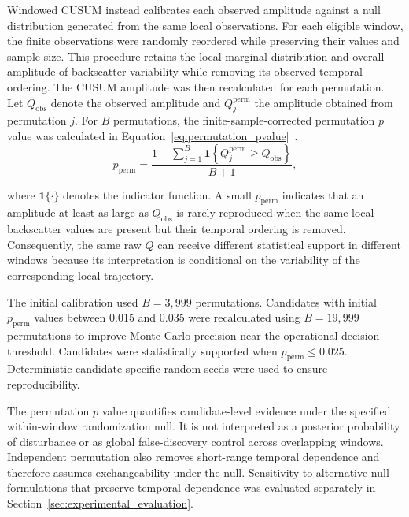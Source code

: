 Windowed CUSUM instead calibrates each observed amplitude against a null distribution generated from the same local observations. For each eligible window, the finite observations were randomly reordered while preserving their values and sample size. This procedure retains the local marginal distribution and overall amplitude of backscatter variability while removing its observed temporal ordering. The CUSUM amplitude was then recalculated for each permutation. Let $Q_{\mathrm{obs}}$ denote the observed amplitude and $Q_j^{\mathrm{perm}}$ the amplitude obtained from permutation $j$. For $B$ permutations, the finite-sample-corrected permutation $p$ value was calculated in Equation~\eqref{eq:permutation_pvalue}~\citep{PhipsonSmyth2010Permutation}.
\begin{equation}
    p_{\mathrm{perm}}
    =
    \frac{
    1+\sum_{j=1}^{B}
    \mathbf{1}
    \left\{
    Q_j^{\mathrm{perm}}
    \geq
    Q_{\mathrm{obs}}
    \right\}
    }{B+1},
    \label{eq:permutation_pvalue}
\end{equation}

where $\mathbf{1}\{\cdot\}$ denotes the indicator function. A small $p_{\mathrm{perm}}$ indicates that an amplitude at least as large as $Q_{\mathrm{obs}}$ is rarely reproduced when the same local backscatter values are present but their temporal ordering is removed. Consequently, the same raw $Q$ can receive different statistical support in different windows because its interpretation is conditional on the variability of the corresponding local trajectory.

The initial calibration used $B=3{,}999$ permutations. Candidates with initial $p_{\mathrm{perm}}$ values between 0.015 and 0.035 were recalculated using $B=19{,}999$ permutations to improve Monte Carlo precision near the operational decision threshold. Candidates were statistically supported when $p_{\mathrm{perm}}\leq0.025$. Deterministic candidate-specific random seeds were used to ensure reproducibility.

The permutation $p$ value quantifies candidate-level evidence under the specified within-window randomization null. It is not interpreted as a posterior probability of disturbance or as global false-discovery control across overlapping windows. Independent permutation also removes short-range temporal dependence and therefore assumes exchangeability under the null. Sensitivity to alternative null formulations that preserve temporal dependence was evaluated separately in Section~\ref{sec:experimental_evaluation}.

